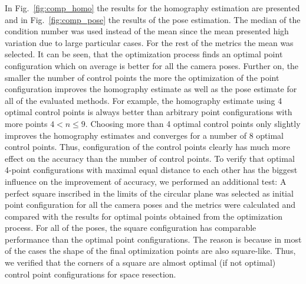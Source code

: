 \documentclass[letterpaper, 10 pt, conference]{ieeeconf}  %
\begin{document}
	In Fig.~\ref{fig:comp_homo} the results for the homography estimation are presented and in Fig.~\ref{fig:comp_pose} the results of the pose estimation. The median of the condition number was used instead of the mean since the mean presented high variation due to large particular cases. For the rest of the metrics the mean was selected. 
	It can be seen, that the optimization process finds an optimal point configuration which on average is better for all the camera poses. Further on, the smaller the number of control points the more the optimization of the point configuration improves the homography estimate as well as the pose estimate for all of the evaluated methods. For example, the homography estimate using 4 optimal control points is always better than arbitrary point configurations with more points $4 < n \leq 9$.    
	Choosing more than 4 optimal control points only slightly improves the homography estimates and converges for a number of 8 optimal control points. Thus, configuration of the control points clearly has much more effect on the accuracy than the number of control points. 
	To verify that optimal 4-point configurations with maximal equal distance to each other has the biggest influence on the improvement of accuracy, we performed an additional test: A perfect square inscribed in the limits of the circular plane was selected as initial point configuration for all the camera poses and the metrics were calculated and compared with the results for optimal points obtained from the optimization process. For all of the poses, the square configuration has comparable performance than the optimal point configurations. The reason is because in most of the cases the shape of the final optimization points are also square-like. Thus, we verified that the corners of a square are almost optimal (if not optimal) control point configurations for space resection.
	
	
\end{document}
